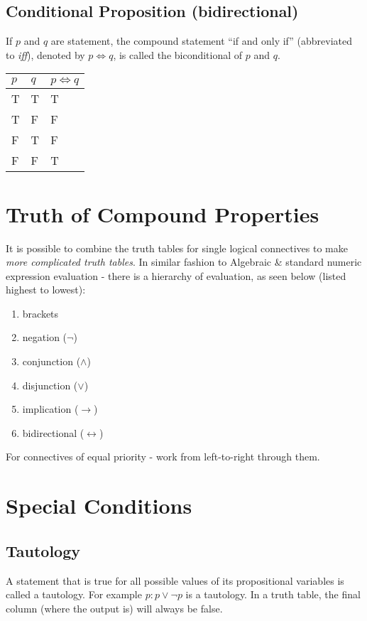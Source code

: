 \subsection{Conditional Proposition (bidirectional)}
If $p$ and $q$ are statement, the compound statement ``if and only if'' (abbreviated to \textit{iff}), denoted by $p \Leftrightarrow q$, is called the biconditional of $p$ and $q$. 
\begin{table}[H]
    \centering
    \begin{tabular}{C{0.1\textwidth} C{0.1\textwidth} C{0.1\textwidth}}
        $p$ & $q$ & $p \Leftrightarrow q$\\
        \hline
        \hline
        T & T & T\\
        \hline
        T & F & F \\
        \hline
        F & T & F \\
        \hline
        F & F & T\\
        \hline
    \end{tabular}
\end{table}

\section{Truth of Compound Properties}
It is possible to combine the truth tables for single logical connectives to make \textit{more complicated truth tables}. In similar fashion to Algebraic \& standard numeric expression evaluation - there is a hierarchy of evaluation, as seen below (listed highest to lowest):
\begin{enumerate}
    \item brackets
    \item negation ($\neg $)
    \item conjunction ($\wedge$)
    \item disjunction ($\vee$)
    \item implication ($\rightarrow$)
    \item bidirectional ($\leftrightarrow$)
\end{enumerate}
For connectives of equal priority - work from left-to-right through them.

\section{Special Conditions}
\subsection{Tautology}
A statement that is true for all possible values of its propositional variables is called a tautology. For example $p: p \vee \neg  p$ is a tautology. In a truth table, the final column (where the output is) will always be false.

